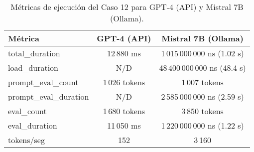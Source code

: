 
\begin{table}[h!]
\centering
\begin{tabular}{|l|c|c|}
\hline
\textbf{Métrica} & \textbf{GPT-4 (API)} & \textbf{Mistral 7B (Ollama)} \\
\hline
total\_duration & 12\,880 ms & 1\,015\,000\,000 ns (1.02 s) \\
load\_duration & N/D & 48\,400\,000\,000 ns (48.4 s) \\
prompt\_eval\_count & 1\,026 tokens & 1\,007 tokens \\
prompt\_eval\_duration & N/D & 2\,585\,000\,000 ns (2.59 s) \\
eval\_count & 1\,680 tokens & 3\,850 tokens \\
eval\_duration & 11\,050 ms & 1\,220\,000\,000 ns (1.22 s) \\
tokens/seg & 152 & 3\,160 \\
\hline
\end{tabular}
\caption{Métricas de ejecución del Caso 12 para GPT-4 (API) y Mistral 7B (Ollama).}
\end{table}
